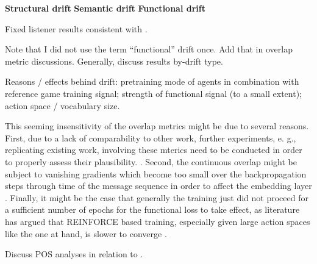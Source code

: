 \textbf{Structural drift}
\textbf{Semantic drift}
\textbf{Functional drift}

Fixed listener results consistent with \cite{lazaridou2020multi}.

Note that I did not use the term ``functional'' drift once. Add that in overlap metric discussions. Generally, discuss results by-drift type.

Reasons / effects behind drift: pretraining mode of agents in combination with reference game training signal; strength of functional signal (to a small extent); action space / vocabulary size. 


This seeming insensitivity of the overlap metrics might be due to several reasons. First, due to a lack of comparability to other work, further experiments, e. g., replicating existing work, involving these mterics need to be conducted in order to properly assess their plausibility. . Second, the continuous overlap might be subject to vanishing gradients which become too small over the backpropagation steps through time of the message sequence in order to affect the embedding layer \parencite[cf.][]{jaeger2002tutorial}. Finally, it might be the case that generally the training just did not proceed for a sufficient number of epochs for the functional loss to take effect, as literature has argued that REINFORCE based training, especially given large action spaces like the one at hand, is slower to converge \parencite{havrylov2017emergence} .

Discuss POS analyses in relation to \cite{lee2019countering}.